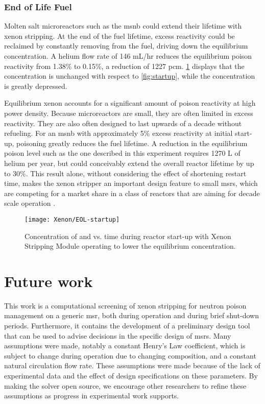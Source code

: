 \subsubsection{End of Life Fuel}\label{sec-EOL}
 Molten salt microreactors such as the \acs{msnb} could extend their lifetime with xenon stripping. At the end of the fuel lifetime, excess reactivity could be reclaimed by constantly removing \Xe from the fuel, driving down the equilibrium concentration. A helium flow rate of 146 mL/hr reduces the equilibrium poison reactivity from 1.38\% to 0.15\%, a reduction of 1227 pcm. \cref{fig:EOLstartup} displays that the \I concentration is unchanged with respect to \cref{fig:startup}, while the \Xe concentration is greatly depressed. 
 
 Equilibrium xenon accounts for a significant amount of poison reactivity at high power density. Because microreactors are small, they are often limited in excess reactivity. They are also often designed to last upwards of a decade without refueling. For an \acs{msnb} with approximately 5\% excess reactivity at initial start-up, \Xe poisoning greatly reduces the fuel lifetime. A reduction in the equilibrium poison level such as the one described in this experiment requires 1270 L of helium per year, but could conceivably extend the overall reactor lifetime by up to 30\%.
This result alone, without considering the effect of shortening restart time, makes the xenon stripper an important design feature to small \acsp{msr}, which are competing for a market share in a class of reactors that are aiming for decade scale operation \cite{PetersonMS}.

\begin{figure}[ht!]
    \centering
    \texttt{[image: Xenon/EOL-startup]}
    \caption[Concentration of \I and \Xe vs. time during start-up - End of Life Fuel Mode]{Concentration of \I and \Xe vs. time during reactor start-up with Xenon Stripping Module operating to lower the equilibrium \Xe concentration.}
    \label{fig:EOLstartup}
\end{figure}


\section{Future work} \label{sec-fwk}
This work is a computational screening of xenon stripping for neutron poison management on a generic \acs{msr}, both during operation and during brief shut-down periods. Furthermore, it contains the development of a preliminary design tool that can be used to advise decisions in the specific design of \acsp{msr}. Many assumptions were made, notably a constant Henry's Law coefficient, which is subject to change during operation due to changing composition, and a constant natural circulation flow rate. These assumptions were made because of the lack of experimental data and the effect of design specifications on these parameters. By making the solver open source, we encourage other researchers to refine these assumptions as progress in experimental work supports.

